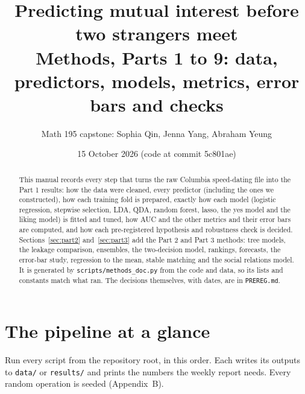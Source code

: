\documentclass[11pt]{article}
\title{Predicting mutual interest before two strangers meet\\[0.3em]\large Methods, Parts 1 to 9: data, predictors, models, metrics, error bars and checks}
\author{Math 195 capstone: Sophia Qin, Jenna Yang, Abraham Yeung}
\date{15 October 2026 \quad (code at commit 5c801ae)}
\begin{document}
\maketitle
\begin{abstract}
This manual records every step that turns the raw Columbia speed-dating file into the Part 1 results: how the data
were cleaned, every predictor (including the ones we constructed), how each training fold is prepared, exactly how
each model (logistic regression, stepwise selection, LDA, QDA, random forest, lasso, the yes model and the liking
model) is fitted and tuned, how AUC and the other metrics and their error bars are computed, and how each
pre-registered hypothesis and robustness check is decided. Sections~\ref{sec:part2} and~\ref{sec:part3} add the Part 2
and Part 3 methods: tree models, the leakage comparison, ensembles, the two-decision model, rankings, forecasts, the
error-bar study, regression to the mean, stable matching and the social relations model. It is generated by \texttt{scripts/methods\_doc.py}
from the code and data, so its lists and constants match what ran. The decisions themselves, with dates, are in
\texttt{PREREG.md}.
\end{abstract}
\tableofcontents
\newpage


\section{The pipeline at a glance}

Run every script from the repository root, in this order. Each writes its outputs to \texttt{data/} or \texttt{results/} and prints the numbers the weekly report needs. Every random operation is seeded (Appendix~B).
\end{document}
